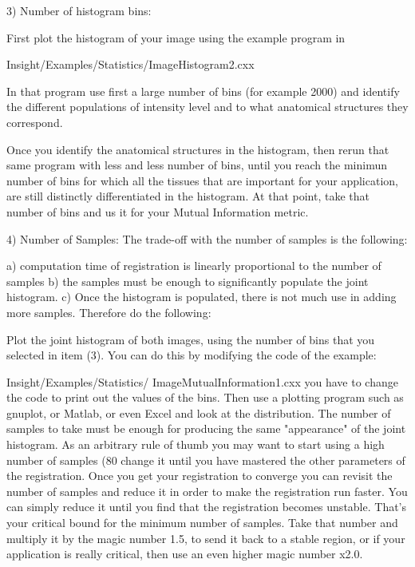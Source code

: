 3) Number of histogram bins:

    First plot the histogram of your image using the
    example program in

    Insight/Examples/Statistics/ImageHistogram2.cxx

    In that program use first a large number  of bins
    (for example 2000) and identify the different
    populations of intensity level and to what anatomical
    structures they correspond.

    Once you identify the anatomical structures in the
    histogram, then rerun that same program with less
    and less number of bins, until you reach the minimun
    number of bins for which all the tissues that are important
    for your application, are still distinctly differentiated in the
    histogram.  At that point, take that number of bins and
    us it for your Mutual Information metric.


4)  Number of Samples:
    The trade-off with the number of samples is the following:

    a) computation time of registration is linearly proportional
       to the number of samples
                                                                                                                        b) the samples must be enough to significantly populate
                                                                                                                           the joint histogram.
                                                                                                                        c) Once the histogram is populated, there is not much
                                                                                                                           use in adding more samples.
Therefore do the following:

Plot the joint histogram of both images, using the number
of bins that you selected in item (3). You can do this by
modifying the code of the example:

Insight/Examples/Statistics/
ImageMutualInformation1.cxx
you have to change the code to print out the values
of the bins. Then use a plotting program such as gnuplot,
or Matlab, or even Excel and look at the distribution.
The number of samples to take must be enough
for producing the same "appearance" of the joint histogram.
As an arbitrary rule of thumb you may want to start using
a high number of samples (80%
change it until you have mastered the other parameters
of the registration.  Once you get your registration to converge
you can revisit the number of samples and reduce it in order
to make the registration run faster. You can simply reduce it
until you find that the registration becomes unstable. That's
your critical bound for the minimum number of samples.
Take that number and multiply it by the magic number 1.5,
to send it back to a stable region, or if your application is
really critical, then use an even higher magic number x2.0.

